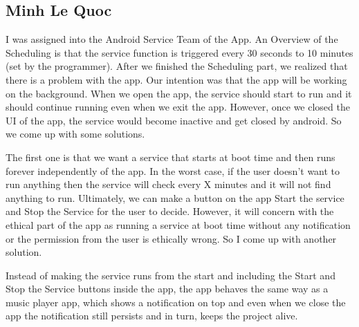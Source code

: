 \documentclass{article}
\begin{document}
\subsection{Minh Le Quoc}
I was assigned into the Android Service Team of the App. An Overview of the Scheduling is that the service function is triggered every 30 seconds to 10 minutes (set by the programmer). After we finished the Scheduling part, we realized that there is a problem with the app. Our intention was that the app will be working on the background. When we open the app, the service should start to run and it should continue running even when we exit the app. However, once we closed the UI of the app, the service would become inactive and get closed by android. So we come up with some solutions.

The first one is that we want a service that starts at boot time and then runs forever independently of the app. In the worst case, if the user doesn't want to run anything then the service will check every X minutes and it will not find anything to run. Ultimately, we can make a button on the app Start the service and Stop the Service for the user to decide. However, it will concern with the ethical part of the app as running a service at boot time without any notification or the permission from the user is ethically wrong. So I come up with another solution.

Instead of making the service runs from the start and including the Start and Stop the Service buttons inside the app, the app behaves the same way as a music player app, which shows a notification on top and even when we close the app the notification still persists and in turn, keeps the project alive.
\end{document}
